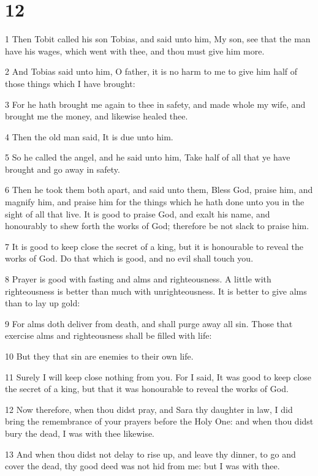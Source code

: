 \chapter{12}

\par 1 Then Tobit called his son Tobias, and said unto him, My son, see that the man have his wages, which went with thee, and thou must give him more.
\par 2 And Tobias said unto him, O father, it is no harm to me to give him half of those things which I have brought:
\par 3 For he hath brought me again to thee in safety, and made whole my wife, and brought me the money, and likewise healed thee.
\par 4 Then the old man said, It is due unto him.
\par 5 So he called the angel, and he said unto him, Take half of all that ye have brought and go away in safety.
\par 6 Then he took them both apart, and said unto them, Bless God, praise him, and magnify him, and praise him for the things which he hath done unto you in the sight of all that live. It is good to praise God, and exalt his name, and honourably to shew forth the works of God; therefore be not slack to praise him.
\par 7 It is good to keep close the secret of a king, but it is honourable to reveal the works of God. Do that which is good, and no evil shall touch you.
\par 8 Prayer is good with fasting and alms and righteousness. A little with righteousness is better than much with unrighteousness. It is better to give alms than to lay up gold:
\par 9 For alms doth deliver from death, and shall purge away all sin. Those that exercise alms and righteousness shall be filled with life:
\par 10 But they that sin are enemies to their own life.
\par 11 Surely I will keep close nothing from you. For I said, It was good to keep close the secret of a king, but that it was honourable to reveal the works of God.
\par 12 Now therefore, when thou didst pray, and Sara thy daughter in law, I did bring the remembrance of your prayers before the Holy One: and when thou didst bury the dead, I was with thee likewise.
\par 13 And when thou didst not delay to rise up, and leave thy dinner, to go and cover the dead, thy good deed was not hid from me: but I was with thee.
